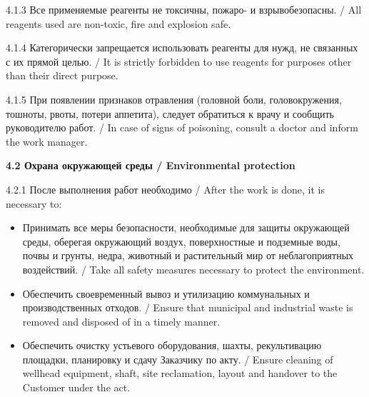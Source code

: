 \documentclass[11pt]{article}
\begin{document}
\vspace{0.2em}

4.1.3 Все применяемые реагенты не токсичны, пожаро- и взрывобезопасны. / All reagents used are non-toxic, fire and explosion safe.

\vspace{0.2em}

4.1.4 Категорически запрещается использовать реагенты для нужд, не связанных с их прямой целью. / It is strictly forbidden to use reagents for purposes other than their direct purpose.

\vspace{0.2em}

4.1.5 При появлении признаков отравления (головной боли, головокружения, тошноты, рвоты, потери аппетита), следует обратиться к врачу и сообщить руководителю работ. / In case of signs of poisoning, consult a doctor and inform the work manager.

\vspace{0.6em}
\textbf{4.2 Охрана окружающей среды / Environmental protection}

\vspace{0.3em}

4.2.1 После выполнения работ необходимо / After the work is done, it is necessary to:

\begin{itemize}[leftmargin=1.5em, topsep=0.2em, itemsep=0.1em]
\item Принимать все меры безопасности, необходимые для защиты окружающей среды, оберегая окружающий воздух, поверхностные и подземные воды, почвы и грунты, недра, животный и растительный мир от неблагоприятных воздействий. / Take all safety measures necessary to protect the environment.

\item Обеспечить своевременный вывоз и утилизацию коммунальных и производственных отходов. / Ensure that municipal and industrial waste is removed and disposed of in a timely manner.

\item Обеспечить очистку устьевого оборудования, шахты, рекультивацию площадки, планировку и сдачу Заказчику по акту. / Ensure cleaning of wellhead equipment, shaft, site reclamation, layout and handover to the Customer under the act.
\end{itemize}
\end{document}
